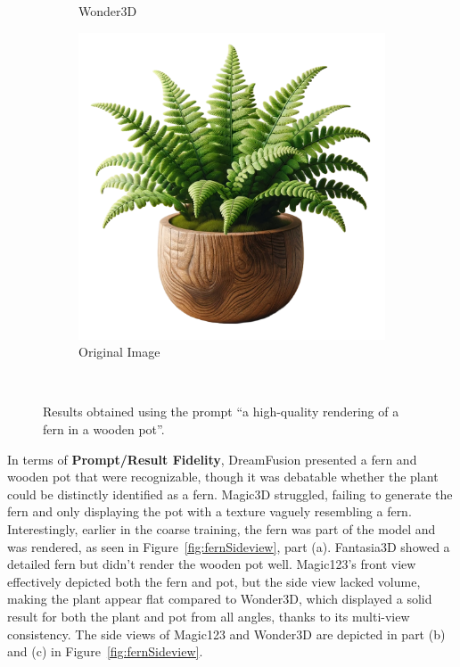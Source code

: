 \begin{figure}[ht]
\begin{subfigure}[b]{0.27\textwidth}
        \caption{Wonder3D}
        \vspace{0.1cm}
    \end{subfigure}
    \begin{subfigure}[b]{0.28\textwidth}
        \centering
        \includegraphics[width=\textwidth]{etc/Images/fern.png}
        \caption{Original Image}
        \vspace{0.1cm}
    \end{subfigure}
    \caption{Results obtained using the prompt ``a high-quality rendering of a fern in a wooden pot''.}~\label{fig:resultFern}
\end{figure}

In terms of \textbf{Prompt/Result Fidelity}, DreamFusion presented a fern and wooden pot that were recognizable, though it was debatable whether the plant could be distinctly identified as a fern. Magic3D struggled, failing to generate the fern and only displaying the pot with a texture vaguely resembling a fern. Interestingly, earlier in the coarse training, the fern was part of the model and was rendered, as seen in Figure~\ref{fig:fernSideview}, part (a). Fantasia3D showed a detailed fern but didn't render the wooden pot well. Magic123's front view effectively depicted both the fern and pot, but the side view lacked volume, making the plant appear flat compared to Wonder3D, which displayed a solid result for both the plant and pot from all angles, thanks to its multi-view consistency. The side views of Magic123 and Wonder3D are depicted in part (b) and (c) in Figure~\ref{fig:fernSideview}.\\

